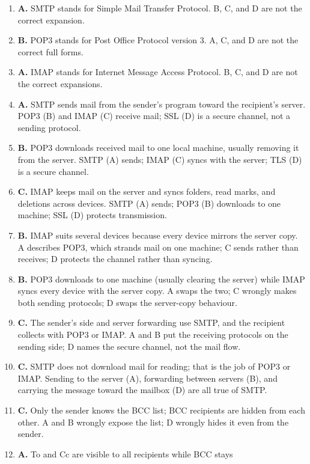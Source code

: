 \begin{enumerate}[label=\textbf{Q\arabic*.}, leftmargin=*]
\item \textbf{A.} SMTP stands for Simple Mail Transfer Protocol. B, C, and D
  are not the correct expansion.
\item \textbf{B.} POP3 stands for Post Office Protocol version 3. A, C, and
  D are not the correct full forms.
\item \textbf{A.} IMAP stands for Internet Message Access Protocol. B, C,
  and D are not the correct expansions.
\item \textbf{A.} SMTP sends mail from the sender's program toward the
  recipient's server. POP3 (B) and IMAP (C) receive mail; SSL (D) is a secure
  channel, not a sending protocol.
\item \textbf{B.} POP3 downloads received mail to one local machine, usually
  removing it from the server. SMTP (A) sends; IMAP (C) syncs with the
  server; TLS (D) is a secure channel.
\item \textbf{C.} IMAP keeps mail on the server and syncs folders, read
  marks, and deletions across devices. SMTP (A) sends; POP3 (B) downloads to
  one machine; SSL (D) protects transmission.
\item \textbf{B.} IMAP suits several devices because every device mirrors
  the server copy. A describes POP3, which strands mail on one machine; C
  sends rather than receives; D protects the channel rather than syncing.
\item \textbf{B.} POP3 downloads to one machine (usually clearing the
  server) while IMAP syncs every device with the server copy. A swaps the
  two; C wrongly makes both sending protocols; D swaps the server-copy
  behaviour.
\item \textbf{C.} The sender's side and server forwarding use SMTP, and the
  recipient collects with POP3 or IMAP. A and B put the receiving protocols
  on the sending side; D names the secure channel, not the mail flow.
\item \textbf{C.} SMTP does not download mail for reading; that is the job
  of POP3 or IMAP. Sending to the server (A), forwarding between servers
  (B), and carrying the message toward the mailbox (D) are all true of SMTP.
\item \textbf{C.} Only the sender knows the BCC list; BCC recipients are
  hidden from each other. A and B wrongly expose the list; D wrongly hides
  it even from the sender.
\item \textbf{A.} To and Cc are visible to all recipients while BCC stays

\end{enumerate}
